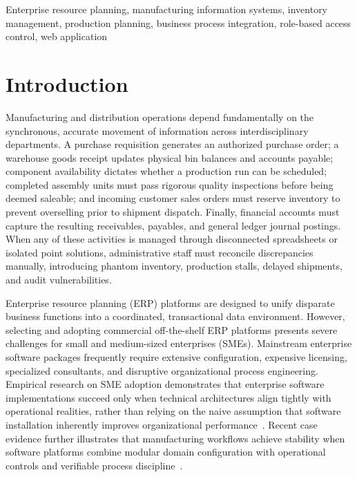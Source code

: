 \documentclass[conference]{IEEEtran}
\begin{document}
\begin{IEEEkeywords}
Enterprise resource planning, manufacturing information systems, inventory management, production planning, business process integration, role-based access control, web application
\end{IEEEkeywords}

\section{Introduction}
Manufacturing and distribution operations depend fundamentally on the synchronous, accurate movement of information across interdisciplinary departments. A purchase requisition generates an authorized purchase order; a warehouse goods receipt updates physical bin balances and accounts payable; component availability dictates whether a production run can be scheduled; completed assembly units must pass rigorous quality inspections before being deemed saleable; and incoming customer sales orders must reserve inventory to prevent overselling prior to shipment dispatch. Finally, financial accounts must capture the resulting receivables, payables, and general ledger journal postings. When any of these activities is managed through disconnected spreadsheets or isolated point solutions, administrative staff must reconcile discrepancies manually, introducing phantom inventory, production stalls, delayed shipments, and audit vulnerabilities.

Enterprise resource planning (ERP) platforms are designed to unify disparate business functions into a coordinated, transactional data environment. However, selecting and adopting commercial off-the-shelf ERP platforms presents severe challenges for small and medium-sized enterprises (SMEs). Mainstream enterprise software packages frequently require extensive configuration, expensive licensing, specialized consultants, and disruptive organizational process engineering. Empirical research on SME adoption demonstrates that enterprise software implementations succeed only when technical architectures align tightly with operational realities, rather than relying on the naive assumption that software installation inherently improves organizational performance~\cite{b1}. Recent case evidence further illustrates that manufacturing workflows achieve stability when software platforms combine modular domain configuration with operational controls and verifiable process discipline~\cite{b2}.
\end{document}
